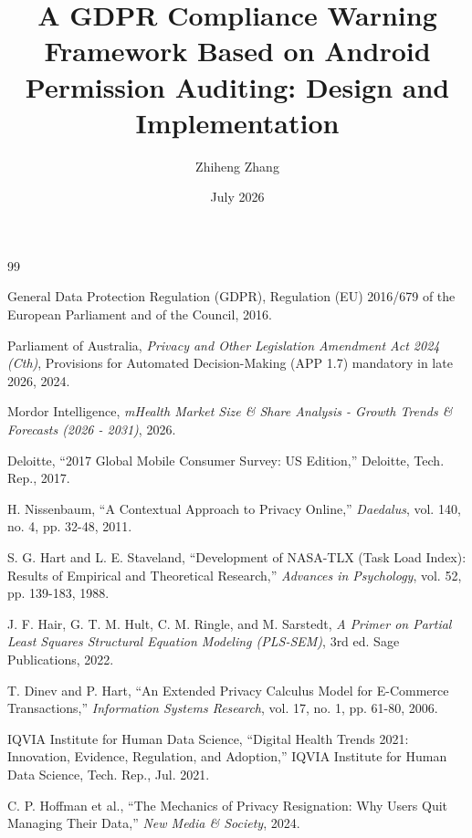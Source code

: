 \documentclass{article}
\title{A GDPR Compliance Warning Framework Based on Android Permission Auditing: Design and Implementation}
\author{Zhiheng Zhang}
\date{July 2026}
\begin{document}
\maketitle
\newpage\tableofcontents
\newpage










\begin{thebibliography}{99}

 General Data Protection Regulation (GDPR), Regulation (EU) 2016/679 of the European Parliament and of the Council, 2016.

 Parliament of Australia, \emph{Privacy and Other Legislation Amendment Act 2024 (Cth)}, Provisions for Automated Decision-Making (APP 1.7) mandatory in late 2026, 2024.

 Mordor Intelligence, \emph{mHealth Market Size \& Share Analysis - Growth Trends \& Forecasts (2026 - 2031)}, 2026.

 Deloitte, ``2017 Global Mobile Consumer Survey: US Edition,'' Deloitte, Tech. Rep., 2017.

 H. Nissenbaum, ``A Contextual Approach to Privacy Online,'' \emph{Daedalus}, vol. 140, no. 4, pp. 32-48, 2011.

 S. G. Hart and L. E. Staveland, ``Development of NASA-TLX (Task Load Index): Results of Empirical and Theoretical Research,'' \emph{Advances in Psychology}, vol. 52, pp. 139-183, 1988.

 J. F. Hair, G. T. M. Hult, C. M. Ringle, and M. Sarstedt, \emph{A Primer on Partial Least Squares Structural Equation Modeling (PLS-SEM)}, 3rd ed. Sage Publications, 2022.

 T. Dinev and P. Hart, ``An Extended Privacy Calculus Model for E-Commerce Transactions,'' \emph{Information Systems Research}, vol. 17, no. 1, pp. 61-80, 2006.

 IQVIA Institute for Human Data Science, ``Digital Health Trends 2021: Innovation, Evidence, Regulation, and Adoption,'' IQVIA Institute for Human Data Science, Tech. Rep., Jul. 2021.

 C. P. Hoffman et al., ``The Mechanics of Privacy Resignation: Why Users Quit Managing Their Data,'' \emph{New Media \& Society}, 2024.


\end{thebibliography}
\end{document}
